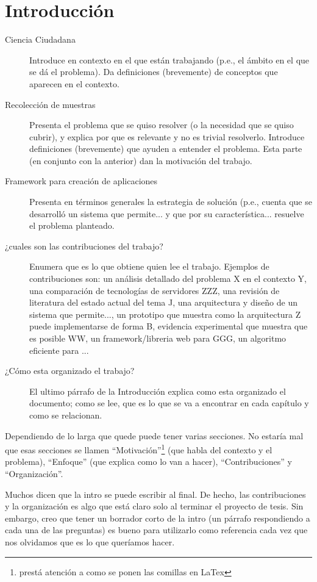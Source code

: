 \chapter{Introducción}

\label{introduccion}

\begin{description}
\item[ Ciencia  Ciudadana ] Introduce en contexto en el que están trabajando (p.e., el ámbito en el que se dá el problema). Da definiciones (brevemente) de conceptos que aparecen en el contexto. 
\item[ Recolección de muestras ] Presenta el problema que se quiso resolver (o la necesidad que se quiso cubrir), y explica por que es relevante y no es trivial resolverlo.  Introduce definiciones (brevemente) que ayuden a entender el problema. Esta parte (en conjunto con la anterior) dan la motivación del trabajo. 
\item[ Framework para creación de aplicaciones ] Presenta en términos generales la estrategia de solución (p.e., cuenta que se desarrolló un sistema que permite... y que por su característica... resuelve el problema planteado.
\item[¿cuales son las contribuciones del trabajo? ] Enumera que es lo que obtiene quien lee el trabajo. Ejemplos de contribuciones son: un análisis detallado del problema X en el contexto Y, una comparación de tecnologías de servidores ZZZ, una revisión de literatura del estado actual del tema J, una arquitectura y diseño de un sistema que permite..., un prototipo que muestra como la arquitectura Z puede implementarse de forma B, evidencia experimental que muestra que es posible WW, un framework/libreria web para GGG, un algoritmo eficiente para ...   
\item[¿Cómo esta organizado el trabajo?] El ultimo párrafo de la Introducción explica como esta organizado el documento; como se lee, que es lo que se va a encontrar en cada capítulo y como se relacionan.   
\end{description}

Dependiendo de lo larga que quede puede tener varias secciones. No estaría mal que esas secciones se llamen ``Motivación''\footnote{prestá atención a como se ponen las comillas en LaTex} (que habla del contexto y el problema), ``Enfoque'' (que explica como lo van a hacer), ``Contribuciones'' y ``Organización''.  

Muchos dicen que la intro se puede escribir al final. De hecho, las contribuciones y la organización es algo que está claro solo al terminar el proyecto de tesis. Sin embargo, creo que tener un borrador corto de la intro (un párrafo respondiendo a cada una de las preguntas) es bueno para utilizarlo como referencia cada vez que nos olvidamos que es lo que queríamos hacer. 


